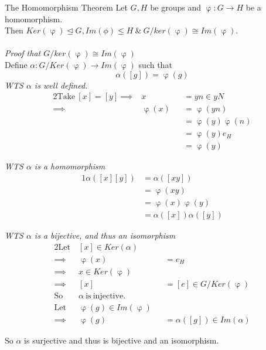 \documentclass[11pt,a4paper]{article}
\begin{document}
\subtitle{Theorem 17.01 - }{The Homomorphism Theorem}
Let $G, H$ be groups and $\upvarphi : G \to H$ be a homomorphism.\\
Then $Ker(\upvarphi) \trianglelefteq G, Im(\phi) \leq H\ \&\ G / ker(\upvarphi) \cong Im(\upvarphi)$.\\\\
\textit{Proof that $G / ker(\upvarphi) \cong Im(\upvarphi)$}\\
Define $\alpha : G/Ker(\upvarphi) \to Im(\upvarphi)$ such that
$$\alpha([g]) = \upvarphi(g)$$
\textit{WTS $\alpha$ is well defined.}\\
\begin{alignat*}{2}
  \mathrm{Take\ } [x] = [y] \implies& x &&= yn \in yN\\
  \implies& \upvarphi(x) &&= \upvarphi(yn)\\
  & &&= \upvarphi(y) \upvarphi(n)\\
  & &&= \upvarphi(y) e_H\\
  & &&= \upvarphi(y)
\end{alignat*}

\textit{WTS $\alpha$ is a homomorphism}
\begin{alignat*}{1}
  \alpha([x][y]) &= \alpha([xy])\\
  &= \upvarphi(xy)\\
  &= \upvarphi(x) \upvarphi(y)\\
  &= \alpha([x])\alpha([y])
\end{alignat*}

\textit{WTS $\alpha$ is a bijective, and thus an isomorphism}
\begin{alignat*}{2}
  \mathrm{Let\ }& [x] \in Ker(\alpha) \\
  \implies& \upvarphi(x) &&= e_H\\
  \implies& x \in Ker(\upvarphi) \\
  \implies& [x] &&= [e] \in G/Ker(\upvarphi)\\
  \mathrm{So\ \ }& \alpha \mathrm{\ is\ injective.}\\
  \mathrm{Let\ }& \upvarphi(g) \in Im(\upvarphi)\\
  \implies& \upvarphi(g) &&= \alpha([g]) \in Im(\alpha)
\end{alignat*}

So $\alpha$ is surjective and thus is bijective and an isomorphism.
\end{document}
